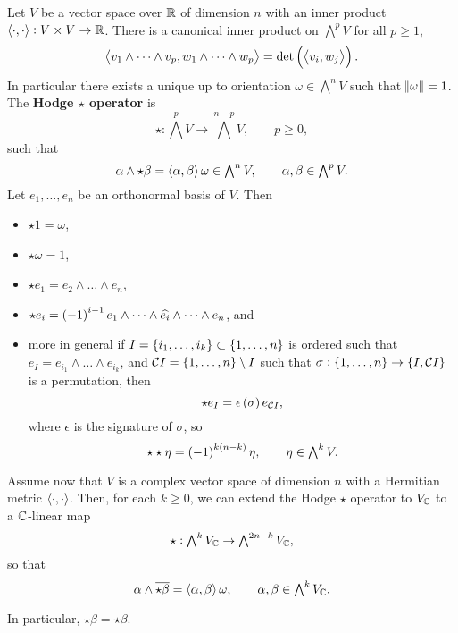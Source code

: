 Let $ V $ be a vector space over $ \mathbb{R} $ of dimension $ n $ with an inner product $ \left\langle \cdot, \cdot \right\rangle : V \times V \to \mathbb{R} $. There is a canonical inner product on $ \bigwedge^pV $ for all $ p \ge 1 $,
$$ \abr{v_1 \wedge \dots \wedge v_p, w_1 \wedge \dots \wedge w_p} = \det \br{\abr{v_i, w_j}}. $$
In particular there exists a unique up to orientation $ \omega \in \bigwedge^nV $ such that $ \norm{\omega} = 1 $. The \textbf{Hodge $ \star $ operator} is
$$ \star : \textstyle\bigwedge^pV \to \textstyle\bigwedge^{n - p}V, \qquad p \ge 0, $$
such that
$$ \alpha \wedge \star\beta = \left\langle \alpha, \beta \right\rangle\omega \in \textstyle\bigwedge^nV, \qquad \alpha, \beta \in \textstyle\bigwedge^pV. $$
Let $ e_1, \dots, e_n $ be an orthonormal basis of $ V $. Then
\begin{itemize}
\item $ \star 1 = \omega $,
\item $ \star\omega = 1 $,
\item $ \star e_1 = e_2 \wedge \dots \wedge e_n $,
\item $ \star e_i = \br{-1}^{i - 1}e_1 \wedge \dots \wedge \widehat{e_i} \wedge \dots \wedge e_n $, and
\item more in general if $ I = \cbr{i_1, \dots, i_k} \subset \cbr{1, \dots, n} $ is ordered such that $ e_I = e_{i_1} \wedge \dots \wedge e_{i_k} $, and $ \CCC I = \cbr{1, \dots, n} \setminus I $ such that $ \sigma : \cbr{1, \dots, n} \to \cbr{I, \CCC I} $ is a permutation, then
$$ \star e_I = \epsilon\br{\sigma}e_{\CCC I}, $$
where $ \epsilon $ is the signature of $ \sigma $, so
$$ \star\star\eta = \br{-1}^{k\br{n - k}}\eta, \qquad \eta \in \textstyle\bigwedge^kV. $$
\end{itemize}
Assume now that $ V $ is a complex vector space of dimension $ n $ with a Hermitian metric $ \left\langle \cdot, \cdot \right\rangle $. Then, for each $ k \ge 0 $, we can extend the Hodge $ \star $ operator to $ V_{\mathbb{C}} $ to a $ \mathbb{C} $-linear map
$$ \star : \textstyle\bigwedge^kV_{\mathbb{C}} \to \textstyle\bigwedge^{2n - k}V_{\mathbb{C}}, $$
so that
$$ \alpha \wedge \overline{\star\beta} = \left\langle \alpha, \beta \right\rangle\omega, \qquad \alpha, \beta \in \textstyle\bigwedge^kV_{\mathbb{C}}. $$

\begin{note*}
In particular, $ \overline{\star\beta} = \star\overline{\beta} $.
\end{note*}

\pagebreak

